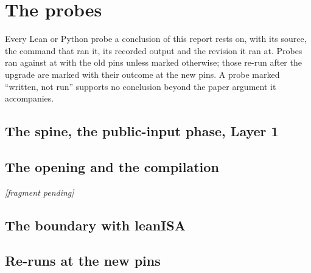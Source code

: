 \chapter{The probes}\label{ch:probes}

Every Lean or Python probe a conclusion of this report rests on, with its source, the command
that ran it, its recorded output and the revision it ran at. Probes ran against  at
 with the old pins unless marked otherwise; those re-run after the upgrade are
marked with their outcome at the new pins. A probe marked \enquote{written, not run} supports no
conclusion beyond the paper argument it accompanies.

\section{The spine, the public-input phase, Layer 1}

\section{The opening and the compilation}
\ifopeningready{}\else\emph{[fragment pending]}\fi

\section{The boundary with leanISA}

\section{Re-runs at the new pins}

